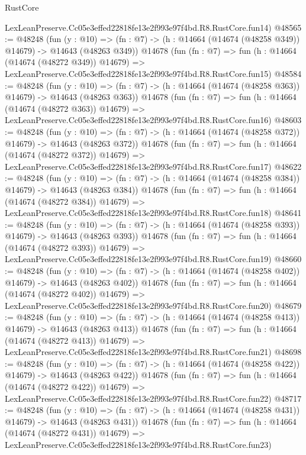 \begin{lexlean}{RustCore}
\begin{coremodule}
    LexLeanPreserve.Cc05e3effed22818fe13e2f993e97f4bd.R8.RustCore.fun14)
@48565 := @48248
    (fun (y : @10) =>
    (fn : @7) -> (h : @14664 (@14674 (@48258 @349)) @14679) -> @14643 (@48263 @349))
    @14678
    (fun (fn : @7) =>
    fun (h : @14664 (@14674 (@48272 @349)) @14679) =>
    LexLeanPreserve.Cc05e3effed22818fe13e2f993e97f4bd.R8.RustCore.fun15)
@48584 := @48248
    (fun (y : @10) =>
    (fn : @7) -> (h : @14664 (@14674 (@48258 @363)) @14679) -> @14643 (@48263 @363))
    @14678
    (fun (fn : @7) =>
    fun (h : @14664 (@14674 (@48272 @363)) @14679) =>
    LexLeanPreserve.Cc05e3effed22818fe13e2f993e97f4bd.R8.RustCore.fun16)
@48603 := @48248
    (fun (y : @10) =>
    (fn : @7) -> (h : @14664 (@14674 (@48258 @372)) @14679) -> @14643 (@48263 @372))
    @14678
    (fun (fn : @7) =>
    fun (h : @14664 (@14674 (@48272 @372)) @14679) =>
    LexLeanPreserve.Cc05e3effed22818fe13e2f993e97f4bd.R8.RustCore.fun17)
@48622 := @48248
    (fun (y : @10) =>
    (fn : @7) -> (h : @14664 (@14674 (@48258 @384)) @14679) -> @14643 (@48263 @384))
    @14678
    (fun (fn : @7) =>
    fun (h : @14664 (@14674 (@48272 @384)) @14679) =>
    LexLeanPreserve.Cc05e3effed22818fe13e2f993e97f4bd.R8.RustCore.fun18)
@48641 := @48248
    (fun (y : @10) =>
    (fn : @7) -> (h : @14664 (@14674 (@48258 @393)) @14679) -> @14643 (@48263 @393))
    @14678
    (fun (fn : @7) =>
    fun (h : @14664 (@14674 (@48272 @393)) @14679) =>
    LexLeanPreserve.Cc05e3effed22818fe13e2f993e97f4bd.R8.RustCore.fun19)
@48660 := @48248
    (fun (y : @10) =>
    (fn : @7) -> (h : @14664 (@14674 (@48258 @402)) @14679) -> @14643 (@48263 @402))
    @14678
    (fun (fn : @7) =>
    fun (h : @14664 (@14674 (@48272 @402)) @14679) =>
    LexLeanPreserve.Cc05e3effed22818fe13e2f993e97f4bd.R8.RustCore.fun20)
@48679 := @48248
    (fun (y : @10) =>
    (fn : @7) -> (h : @14664 (@14674 (@48258 @413)) @14679) -> @14643 (@48263 @413))
    @14678
    (fun (fn : @7) =>
    fun (h : @14664 (@14674 (@48272 @413)) @14679) =>
    LexLeanPreserve.Cc05e3effed22818fe13e2f993e97f4bd.R8.RustCore.fun21)
@48698 := @48248
    (fun (y : @10) =>
    (fn : @7) -> (h : @14664 (@14674 (@48258 @422)) @14679) -> @14643 (@48263 @422))
    @14678
    (fun (fn : @7) =>
    fun (h : @14664 (@14674 (@48272 @422)) @14679) =>
    LexLeanPreserve.Cc05e3effed22818fe13e2f993e97f4bd.R8.RustCore.fun22)
@48717 := @48248
    (fun (y : @10) =>
    (fn : @7) -> (h : @14664 (@14674 (@48258 @431)) @14679) -> @14643 (@48263 @431))
    @14678
    (fun (fn : @7) =>
    fun (h : @14664 (@14674 (@48272 @431)) @14679) =>
    LexLeanPreserve.Cc05e3effed22818fe13e2f993e97f4bd.R8.RustCore.fun23)

\end{coremodule}
\end{lexlean}
